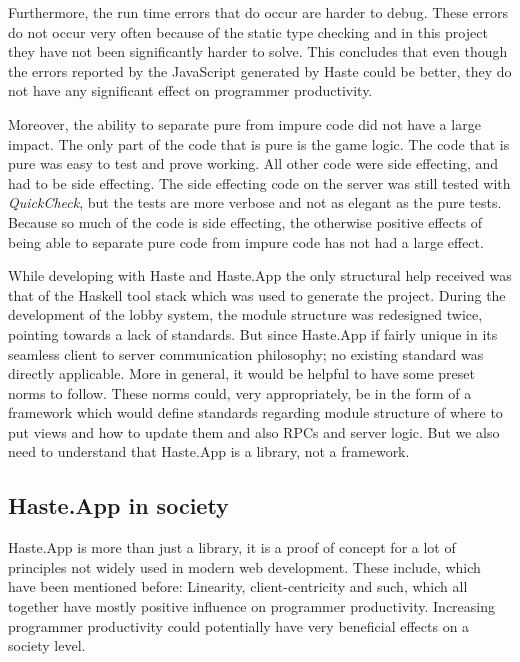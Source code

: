 \documentclass[a4paper]{article}
\begin{document}
Furthermore, the run time errors that do occur are harder to debug. These errors do not occur very often because of the static type checking and in this project they have not been significantly harder to solve. This concludes that even though the errors reported by the JavaScript generated by Haste could be better, they do not have any significant effect on programmer productivity.

Moreover, the ability to separate pure from impure code did not have a large impact. The only part of the code that is pure is the game logic. The code that is pure was easy to test and prove working. All other code were side effecting, and had to be side effecting. The side effecting code on the server was still tested with \textit{QuickCheck}, but the tests are more verbose and not as elegant as the pure tests. Because so much of the code is side effecting, the otherwise positive effects of being able to separate pure code from impure code has not had a large effect.

While developing with Haste and Haste.App the only structural help received was that of the Haskell tool stack  which was used to generate the project. During the development of the lobby system, the module structure was redesigned twice, pointing towards a lack of standards. But since Haste.App if fairly unique in its seamless client to server communication philosophy; no existing standard was directly applicable. More in general, it would be helpful to have some preset norms to follow. These norms could, very appropriately, be in the form of a framework which would define standards regarding module structure of where to put views and how to update them and also RPCs and server logic. But we also need to understand that Haste.App is a library, not a framework.



\subsection{Haste.App in society}
Haste.App is more than just a library, it is a proof of concept for a lot of principles not widely used in modern web development. These include, which have been mentioned before: Linearity, client-centricity and such, which all together have mostly positive influence on programmer productivity. Increasing programmer productivity could potentially have very beneficial effects on a society level.
\end{document}
